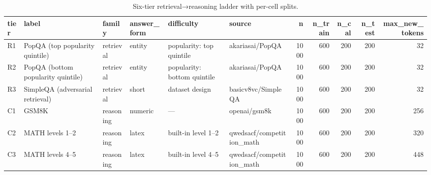 \begin{table}
\caption{Six-tier retrieval→reasoning ladder with per-cell splits.}
\label{tab:t1_dataset_composition}
\begin{tabular}{llllllrrrrr}
\toprule
tier & label & family & answer\_form & difficulty & source & n & n\_train & n\_cal & n\_test & max\_new\_tokens \\
\midrule
R1 & PopQA (top popularity quintile) & retrieval & entity & popularity: top quintile & akariasai/PopQA & 1000 & 600 & 200 & 200 & 32 \\
R2 & PopQA (bottom popularity quintile) & retrieval & entity & popularity: bottom quintile & akariasai/PopQA & 1000 & 600 & 200 & 200 & 32 \\
R3 & SimpleQA (adversarial retrieval) & retrieval & short & dataset design & basicv8vc/SimpleQA & 1000 & 600 & 200 & 200 & 32 \\
C1 & GSM8K & reasoning & numeric & — & openai/gsm8k & 1000 & 600 & 200 & 200 & 256 \\
C2 & MATH levels 1–2 & reasoning & latex & built-in level 1–2 & qwedsacf/competition\_math & 1000 & 600 & 200 & 200 & 320 \\
C3 & MATH levels 4–5 & reasoning & latex & built-in level 4–5 & qwedsacf/competition\_math & 1000 & 600 & 200 & 200 & 448 \\
\bottomrule
\end{tabular}
\end{table}
